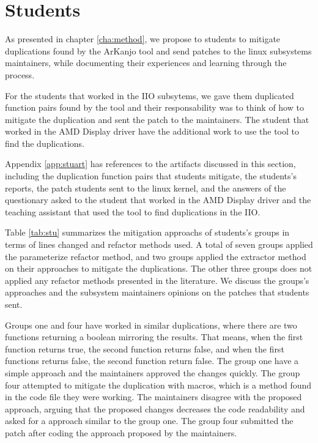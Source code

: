 \section{Students}

As presented in chapter \ref{cha:method}, we propose to students to mitigate duplications
found by the ArKanjo tool and send patches to the linux subsystems maintainers, while
documenting their experiences and learning through the process. 

For the students that worked
in the IIO subsytems, we gave them duplicated function pairs found by the tool and their 
responsability was to think of how to mitigate the duplication and sent the patch to the 
maintainers. The student that worked in the AMD Display driver have the additional work
to use the tool to find the duplications.

Appendix \ref{app:stuart} has references
to the artifacts discussed in this section, including the duplication function pairs that students 
mitigate, the students's reports, the patch students sent to the linux kernel, and the 
answers of the questionary asked to the student that worked in the AMD Display driver and the 
teaching assistant that used the tool to find duplications in the IIO.



Table \ref{tab:stu} summarizes the mitigation approachs of students's groups in terms 
of lines changed and refactor methods used. A total of seven groups applied the parameterize refactor method,
and two groups applied the extractor method on their approaches to mitigate the duplications. 
The other three groups does not applied any refactor methods presented in the literature. 
We discuss the groups's approaches and the subsystem maintainers opinions on the patches that students
sent.

Groups one and four have worked in similar duplications, where there are two functions returning a boolean mirroring
the results. That means, when the first function returns true, the second function returns false, and when the first
functions returns false, the second function return false. The group one have a simple approach and the maintainers 
approved the changes quickly. The group four attempted to mitigate the duplication with macros, which is a method 
found in the code file they were working. The maintainers disagree with the proposed approach, arguing 
that the proposed changes decreases the code readability and asked for a approach similar to the group one. 
The group four submitted the patch after coding the approach proposed by the maintainers.

